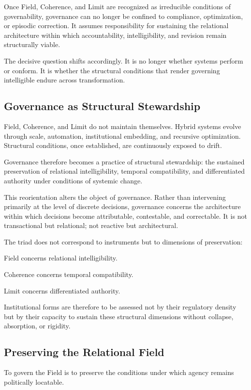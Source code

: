 \documentclass[12pt]{article}
\begin{document}
Once Field, Coherence, and Limit are recognized as irreducible conditions of governability, governance can no longer be confined to compliance, optimization, or episodic correction. It assumes responsibility for sustaining the relational architecture within which accountability, intelligibility, and revision remain structurally viable.

The decisive question shifts accordingly. It is no longer whether systems perform or conform. It is whether the structural conditions that render governing intelligible endure across transformation.

\subsection{Governance as Structural Stewardship}


Field, Coherence, and Limit do not maintain themselves. Hybrid systems evolve through scale, automation, institutional embedding, and recursive optimization. Structural conditions, once established, are continuously exposed to drift.

Governance therefore becomes a practice of structural stewardship: the sustained preservation of relational intelligibility, temporal compatibility, and differentiated authority under conditions of systemic change.

This reorientation alters the object of governance. Rather than intervening primarily at the level of discrete decisions, governance concerns the architecture within which decisions become attributable, contestable, and correctable. It is not transactional but relational; not reactive but architectural.

The triad does not correspond to instruments but to dimensions of preservation:

Field concerns relational intelligibility.

Coherence concerns temporal compatibility.

Limit concerns differentiated authority.

Institutional forms are therefore to be assessed not by their regulatory density but by their capacity to sustain these structural dimensions without collapse, absorption, or rigidity.

\subsection{Preserving the Relational Field}


To govern the Field is to preserve the conditions under which agency remains politically locatable.
\end{document}
